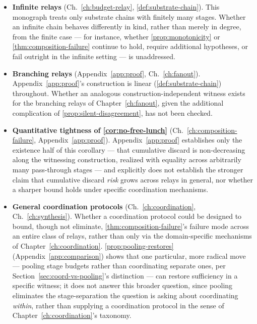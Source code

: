 \begin{itemize}
  \item \textbf{Infinite relays} (Ch.~\ref{ch:budget-relay},
  \cref{def:substrate-chain}). This monograph treats only substrate
  chains with finitely many stages. Whether an infinite chain behaves
  differently in kind, rather than merely in degree, from the finite
  case --- for instance, whether \cref{prop:monotonicity} or
  \cref{thm:composition-failure} continue to hold, require additional
  hypotheses, or fail outright in the infinite setting --- is
  unaddressed.

  \item \textbf{Branching relays} (Appendix~\ref{app:proof},
  Ch.~\ref{ch:fanout}). Appendix~\ref{app:proof}'s construction is linear
  (\cref{def:substrate-chain}) throughout. Whether an analogous
  construction-independent witness exists for the branching relays of
  Chapter~\ref{ch:fanout}, given the additional complication of
  \cref{prop:silent-disagreement}, has not been checked.

  \item \textbf{Quantitative tightness of \cref{cor:no-free-lunch}}
  (Ch.~\ref{ch:composition-failure}, Appendix~\ref{app:proof}).
  Appendix~\ref{app:proof} establishes only the existence half of this
  corollary --- that cumulative discard is non-decreasing along the
  witnessing construction, realized with equality across arbitrarily many
  pass-through stages --- and explicitly does not establish the stronger
  claim that cumulative discard \emph{risk} grows across relays in
  general, nor whether a sharper bound holds under specific coordination
  mechanisms.

  \item \textbf{General coordination protocols} (Ch.~\ref{ch:coordination},
  Ch.~\ref{ch:synthesis}). Whether a coordination protocol could be
  designed to bound, though not eliminate,
  \cref{thm:composition-failure}'s failure mode across an entire class of
  relays, rather than only via the domain-specific mechanisms of
  Chapter~\ref{ch:coordination}. \cref{prop:pooling-restores}
  (Appendix~\ref{app:comparison}) shows that one particular, more radical
  move --- pooling stage budgets rather than coordinating separate ones,
  per Section~\ref{sec:coord-vs-pooling}'s distinction --- can restore
  sufficiency in a specific witness; it does not answer this broader
  question, since pooling eliminates the stage-separation the question is
  asking about coordinating \emph{within}, rather than supplying a
  coordination protocol in the sense of Chapter~\ref{ch:coordination}'s
  taxonomy.


\end{itemize}
